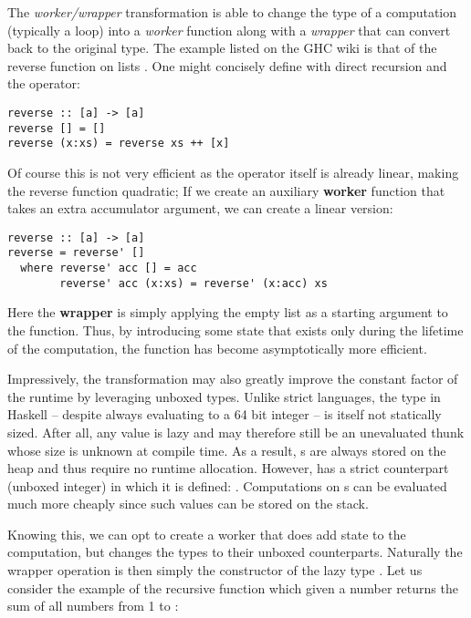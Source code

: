 The \textit{worker/wrapper} transformation is able to change the type of a computation (typically a loop) into a \textit{worker} function
along with a \textit{wrapper} that can convert back to the original type. The example listed on the GHC wiki is that of the reverse
function on lists \cite{ghc_wiki_wwrapper}. One might concisely define  with direct recursion and the \mono{++} operator:

\begin{listing}[H]
\begin{verbatim}
reverse :: [a] -> [a]
reverse [] = []
reverse (x:xs) = reverse xs ++ [x]
\end{verbatim}
\end{listing}

Of course this is not very efficient as the \mono{++} operator itself is already linear, making the reverse function quadratic; If we
create an auxiliary \textbf{worker} function  that takes an extra accumulator argument, we can create a linear version:

\begin{listing}[H]
\begin{verbatim}
reverse :: [a] -> [a]
reverse = reverse' []
  where reverse' acc [] = acc
        reverse' acc (x:xs) = reverse' (x:acc) xs
\end{verbatim}
\end{listing}

Here the \textbf{wrapper} is simply applying the empty list as a starting argument to the function. Thus, by introducing some state
that exists only during the lifetime of the computation, the function has become asymptotically more efficient.

Impressively, the transformation may also greatly improve the constant factor of the runtime by leveraging unboxed types.
Unlike strict languages, the  type in Haskell -- despite always evaluating to a 64 bit integer -- is itself not statically sized.
After all, any value is lazy and may therefore still be an unevaluated thunk whose size is unknown at compile time. As a result, s
are always stored on the heap and thus require no runtime allocation. However,  has a strict counterpart  (unboxed integer)
in which it is defined: . Computations on s can be evaluated much more cheaply since such values can be
stored on the stack.

Knowing this, we can opt to create a worker that does add state to the computation, but changes the types to their unboxed counterparts.
Naturally the wrapper operation is then simply the constructor of the lazy type . Let us consider the example of the recursive  function which
given a number  returns the sum of all numbers from 1 to :


